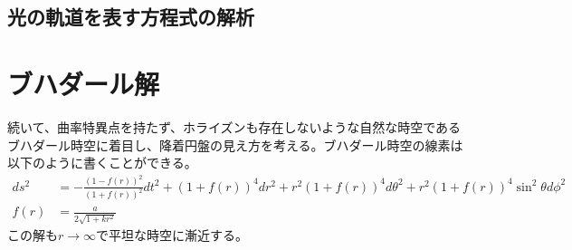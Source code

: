 \documentclass[dvipdfmx]{report} %
\begin{document}
\section{光の軌道を表す方程式の解析}

\chapter{ブハダール解}
続いて、曲率特異点を持たず、ホライズンも存在しないような自然な時空であるブハダール時空に着目し、降着円盤の見え方を考える。ブハダール時空の線素は以下のように書くことができる。
\begin{equation*}
\begin{split}
	ds^2 &=
		- \frac{(1 - f(r))^2}{(1 + f(r))^2} dt^2
		+ (1 + f(r))^4 dr^2
		+ r^2(1 + f(r))^4 d\theta^2
		+ r^2 (1 + f(r))^4 \sin ^2 \theta d\phi^2 \\
	f(r) &= \frac{a}{2\sqrt{1 + k r^2}} 
\end{split}
\end{equation*}
この解も$r \rightarrow \infty$で平坦な時空に漸近する。

\end{document}

